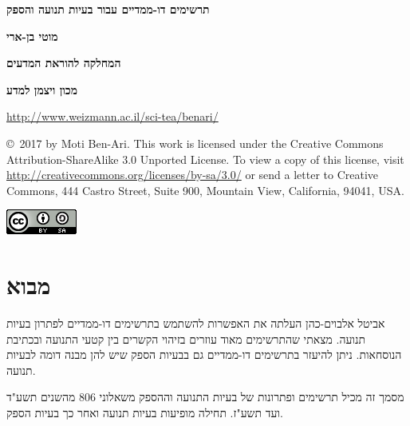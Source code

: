 \documentclass[12pt,a4paper]{article}
\begin{document}
\thispagestyle{empty}


\begin{center}
\textbf{\LARGE תרשימים דו-ממדיים עבור בעיות תנועה והספק}

\bigskip
\bigskip

\textbf{\Large מוטי בן-ארי}

\bigskip

\textbf{\large המחלקה להוראת המדעים}

\bigskip

\textbf{\large מכון ויצמן למדע}

\bigskip

\url{http://www.weizmann.ac.il/sci-tea/benari/}

\end{center}


\begin{footnotesize}
\copyright{}\  2017 by Moti Ben-Ari. This work is licensed under the Creative Commons Attribution-ShareAlike 3.0 Unported License. To view a copy of this license, visit \url{http://creativecommons.org/licenses/by-sa/3.0/} or send a letter to Creative Commons, 444 Castro Street, Suite 900, Mountain View, California, 94041, USA.
\end{footnotesize}

\bigskip

\begin{center}
\includegraphics[width=.2\textwidth]{../by-sa.png}
\end{center}


\section*{מבוא}

אביטל אלבוים-כהן העלתה את האפשרות להשתמש בתרשימים דו-ממדיים לפתרון בעיות תנועה. מצאתי שהתרשימים מאוד עוזרים בזיהוי הקשרים בין קטעי התנועה ובכתיבת הנוסחאות. ניתן להיעזר בתרשימים דו-ממדיים גם בבעיות הספק שיש להן מבנה דומה לבעיות תנועה.

\smallskip

מסמך זה מכיל תרשימים ופתרונות של בעיות התנועה וההספק משאלוני
$806$
מהשנים תשע"ד ועד תשע"ז. תחילה מופיעות בעיות תנועה ואחר כך בעיות הספק.

\smallskip
\end{document}
